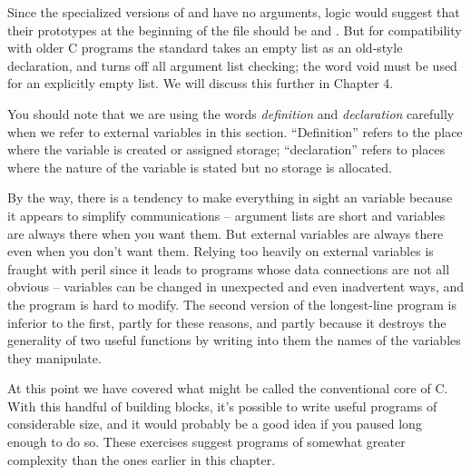 Since the specialized versions of  and  have no arguments, logic would suggest that their prototypes at the beginning of the file should be  and .
But for compatibility with older C programs the standard takes an empty list as an old-style declaration, and turns off all argument list checking; the word void must be used for an explicitly empty list.
We will discuss this further in Chapter 4.

You should note that we are using the words \emph{definition} and \emph{declaration} carefully when we refer to external variables in this section.
``Definition'' refers to the place where the variable is created or assigned storage; ``declaration'' refers to places where the nature of the variable is stated but no storage is allocated.

By the way, there is a tendency to make everything in sight an  variable because it appears to simplify communications -- argument lists are short and variables are always there when you want them.
But external variables are always there even when you don't want them.
Relying too heavily on external variables is fraught with peril since it leads to programs whose data connections are not all obvious -- variables can be changed in unexpected and even inadvertent ways, and the program is hard to modify.
The second version of the longest-line program is inferior to the first, partly for these reasons, and partly because it destroys the generality of two useful functions by writing into them the names of the variables they manipulate.

At this point we have covered what might be called the conventional core of C.
With this handful of building blocks, it's possible to write useful programs of considerable size, and it would probably be a good idea if you paused long enough to do so.
These exercises suggest programs of somewhat greater complexity than the ones earlier in this chapter.
\newline

